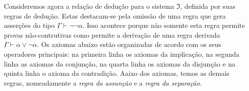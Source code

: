 \vspace{.5\baselineskip}
    Consideremos agora a relação de dedução para o sistema $\mathfrak{I}$, definida por suas regras de dedução.
    Estas destacam-se pela omissão de uma regra que gera asserções do tipo $\Gamma\vdash\neg\neg\alpha$.
    Isso acontece porque não somente esta regra permite provas não-contrutivas como permite a derivação de uma regra derivada $\Gamma\vdash\alpha\vee\neg\alpha$.
    Os axiomas abaixo estão organizadas de acordo com os seus operadores principais: na primeira linha os axiomas da implicação, na segunda linha as axiomas da conjunção, na quarta linha os axiomas da disjunção e na quinta linha o axioma da contradição.
    Aaixo dos axiomas, temos as demais regras, nomeadamente a \emph{regra da assunção} e a \emph{regra da separação}.

\vspace{\baselineskip}
